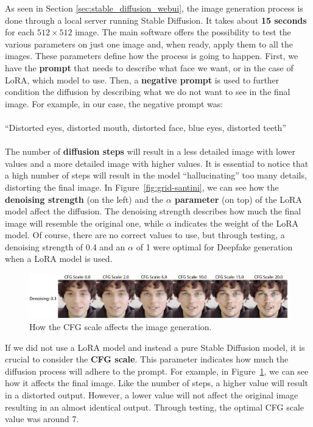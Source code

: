 \documentclass[preprint]{elsarticle}
\begin{document}
As seen in Section \ref{sec:stable_diffusion_webui}, the image generation process is done through 
a local server running Stable Diffusion. 
It takes about \textbf{15 seconds} for each $512 \times 512$ image. 
The main software offers the possibility to test the various parameters 
on just one image and, when ready, apply them to all the images. 
These parameters define how the process is going to happen.
First, we have the \textbf{prompt} that needs to describe what face we want, or in the case of LoRA, 
which model to use.
Then, a \textbf{negative prompt} is used to further condition the diffusion by 
describing what we do not want to see in the final image. 
For example, in our case, the negative prompt was:\\\\
``Distorted eyes, distorted mouth, distorted face, blue eyes, distorted teeth''\\\\
The number of \textbf{diffusion steps} will result in a less detailed image with lower values and 
a more detailed image with higher values. 
It is essential to notice that a high number of steps will result in the model 
``hallucinating'' too many details, distorting the final image.
In Figure~\ref{fig:grid-santini}, we can see how the \textbf{denoising strength} (on the left) 
and the \textbf{$\alpha$ parameter} (on top) of the LoRA model affect the diffusion. 
The denoising strength describes how much the final image will resemble the original one, 
while $\alpha$ indicates the weight of the LoRA model. 
Of course, there are no correct values to use, but through testing, 
a denoising strength of 0.4 and an $\alpha$ of 1 were optimal for
Deepfake generation when a LoRA model is used. 

\begin{figure}[t]
	\centering
	\includegraphics[width=\textwidth, keepaspectratio]{img/project_img/cfg-examples.png}
	\caption{How the CFG scale affects the image generation.}
	\label{fig:cfg-examples}
\end{figure}

If we did not use a LoRA model and instead a pure Stable Diffusion model, 
it is crucial to consider the \textbf{CFG scale}. 
This parameter indicates how much the diffusion process will adhere to the prompt. 
For example, in Figure~\ref{fig:cfg-examples}, we can see how it affects the final image. 
Like the number of steps, a higher value will result in a distorted output. 
However, a lower value will not affect the original image resulting in an almost identical output. 
Through testing, the optimal CFG scale value was around 7.
\end{document}
